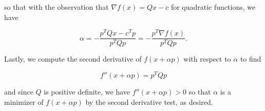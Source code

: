 \begin{solution}
    so that with the observation that $\nabla f(x) = Q x - c$ for quadratic functions, we have

    $$
    \alpha = -\frac{p^T Q x - c^T p}{p^T Q p} = -\frac{p^T \nabla f(x)}{p^T Q p}.
    $$

    Lastly, we compute the second derivative of $f(x + \alpha p)$ with respect to $\alpha$ to find

    $$
    f''(x + \alpha p) = p^T Q p
    $$

    and since $Q$ is positive definite, we have $f''(x + \alpha p) > 0$ so that $\alpha$ is a minimizer of 
    $f(x + \alpha p)$ by the second derivative test, as desired.
    \ \\
\end{solution}
